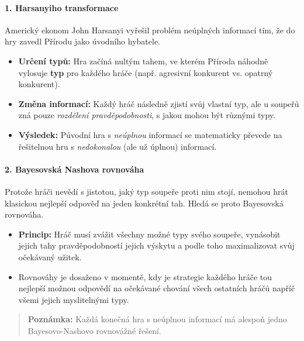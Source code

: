 \paragraph*{1. Harsanyiho transformace}
Americký ekonom John Harsanyi vyřešil problém neúplných informací tím, že do hry zavedl Přírodu jako úvodního hybatele. 
\begin{itemize}
    \item \textbf{Určení typů:} Hra začíná nultým tahem, ve kterém Příroda náhodně vylosuje \textbf{typ} pro každého hráče (např. agresivní konkurent vs. opatrný konkurent).
    \item \textbf{Změna informací:} Každý hráč následně zjistí svůj vlastní typ, ale u soupeřů zná pouze \textit{rozdělení pravděpodobnosti}, s jakou mohou být různými typy.
    \item \textbf{Výsledek:} Původní hra s \textit{neúplnou} informací se matematicky převede na řešitelnou hru s \textit{nedokonalou} (ale už úplnou) informací.
\end{itemize}

\paragraph*{2. Bayesovská Nashova rovnováha}
Protože hráči nevědí s jistotou, jaký typ soupeře proti nim stojí, nemohou hrát klasickou nejlepší odpověď na jeden konkrétní tah. Hledá se proto Bayesovská rovnováha.
\begin{itemize}
    \item \textbf{Princip:} Hráč musí zvážit všechny možné typy svého soupeře, vynásobit jejich tahy pravděpodobností jejich výskytu a podle toho maximalizovat svůj očekávaný užitek. 
    \item Rovnováhy je dosaženo v momentě, kdy je strategie každého hráče tou nejlepší možnou odpovědí na očekávané chování všech ostatních hráčů napříč všemi jejich myslitelnými typy.
\end{itemize}

\begin{quote}
    \textbf{Poznámka:} Každá konečná hra s neúplnou informací má alespoň jedno Bayesovo-Nashovo
rovnovážné řešení.
\end{quote}